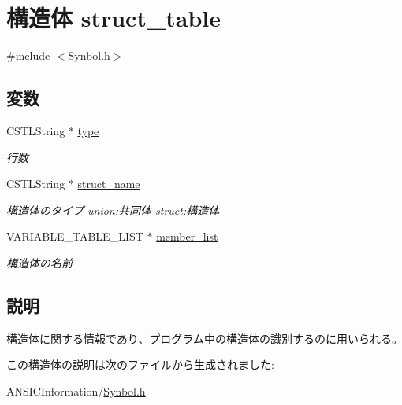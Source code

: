 \hypertarget{structstruct__table}{
\section{構造体 struct\_\-table}
\label{structstruct__table}
}


{\ttfamily \#include $<$Synbol.h$>$}

\subsection*{変数}
\begin{DoxyCompactItemize}
\item 
\hypertarget{structstruct__table_aa24e637ea09371ee5332357c141541f2}{
CSTLString $\ast$ \hyperlink{structstruct__table_aa24e637ea09371ee5332357c141541f2}{type}}
\label{structstruct__table_aa24e637ea09371ee5332357c141541f2}

\begin{DoxyCompactList}\small\item\em 行数 \item\end{DoxyCompactList}\item 
\hypertarget{structstruct__table_ac49bae1a4a5f05919ac8341b1406154d}{
CSTLString $\ast$ \hyperlink{structstruct__table_ac49bae1a4a5f05919ac8341b1406154d}{struct\_\-name}}
\label{structstruct__table_ac49bae1a4a5f05919ac8341b1406154d}

\begin{DoxyCompactList}\small\item\em 構造体のタイプ union:共同体 struct:構造体 \item\end{DoxyCompactList}\item 
\hypertarget{structstruct__table_af8a062298d679adae14b0303053d45a8}{
VARIABLE\_\-TABLE\_\-LIST $\ast$ \hyperlink{structstruct__table_af8a062298d679adae14b0303053d45a8}{member\_\-list}}
\label{structstruct__table_af8a062298d679adae14b0303053d45a8}

\begin{DoxyCompactList}\small\item\em 構造体の名前 \item\end{DoxyCompactList}\end{DoxyCompactItemize}


\subsection{説明}
構造体に関する情報であり、プログラム中の構造体の識別するのに用いられる。 

この構造体の説明は次のファイルから生成されました:\begin{DoxyCompactItemize}
\item 
ANSICInformation/\hyperlink{Synbol_8h}{Synbol.h}\end{DoxyCompactItemize}

